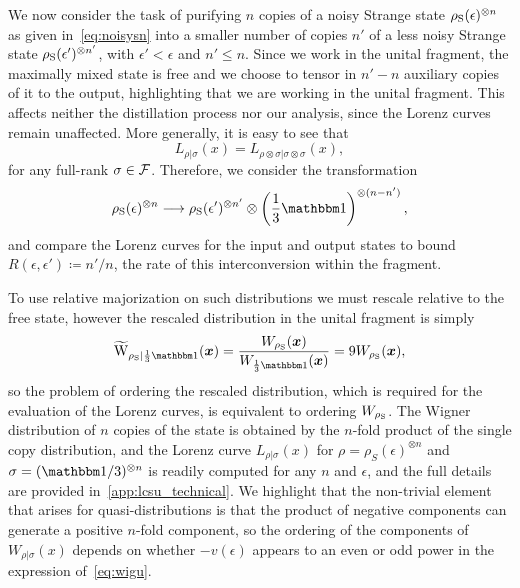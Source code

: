 \documentclass[pra,
aps,
twocolumn,
superscriptaddress,
groupedaddress,
nofootinbib,
reprint
]{revtex4-1}
\begin{document}
We now consider the task of purifying $n$ copies of a noisy Strange state $\rho_{\rm{S}}(\epsilon)^{\otimes n}$ as given in~\cref{eq:noisysn} into a smaller number of copies $n'$ of a less noisy Strange state $\rho_{\rm{S}}(\epsilon')^{\otimes n'}$, with $\epsilon' < \epsilon$ and $n' \leq n$. Since we work in the unital fragment, the maximally mixed state is free and we choose to tensor in $n'-n$ auxiliary copies of it to the output, highlighting that we are working in the unital fragment. This affects neither the distillation process nor our analysis, since the Lorenz curves remain unaffected. More generally, it is easy to see that
\begin{equation}
	L_{\rho |\sigma} (x) = L_{\rho \otimes \sigma |\sigma \otimes \sigma}(x),
\end{equation}
for any full-rank $\sigma \in \mathcal{F}$. Therefore, we consider the transformation
\begin{equation}\label{eq:sudist}
	\rho_{\rm{S}}(\epsilon)^{\otimes n} \longrightarrow \rho_{\rm{S}}(\epsilon')^{\otimes n'} \otimes \left( \frac{1}{3}\id \right)^{\otimes (n-n')},
\end{equation}
and compare the Lorenz curves for the input and output states to bound $R(\epsilon, \epsilon') \coloneqq n'/n$, the rate of this interconversion within the fragment.

To use relative majorization on such distributions we must rescale relative to the free state, however the rescaled distribution in the unital fragment is simply
\begin{equation}
	\widetilde{\rm{W}}_{\rho_{\rm{S}}|\frac{1}{3}\id}(\bmx) = \frac{\W[\bmx]{\rho_{\rm{S}}}}{\W[\bmx]{\frac{1}{3}\id}} = 9\W[\bmx]{\rho_{\rm{S}}},
\end{equation}
so the problem of ordering the rescaled distribution, which is required for the evaluation of the Lorenz curves, is equivalent to ordering $\W{\rho_{\rm{S}}}$. The Wigner distribution of $n$ copies of the state is obtained by the $n$-fold product of the single copy distribution, and the Lorenz curve $L_{\rho|\sigma}(x)$ for $\rho = \rho_S(\epsilon)^{\otimes n}$ and $\sigma = (\I/3)^{\otimes n}$ is readily computed for any $n$ and $\epsilon$, and the full details are provided in~\cref{app:lcsu_technical}.
We highlight that the non-trivial element that arises for quasi-distributions is that the product of negative components can generate a positive $n$-fold component, so the ordering of the components of $W_{\rho |\sigma}(x)$ depends on whether $-v(\epsilon)$ appears to an even or odd power in the expression of~\cref{eq:wigu}.
\end{document}
